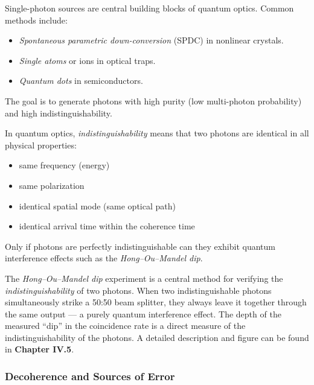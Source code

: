 Single-photon sources are central building blocks of quantum optics. Common methods include:
\begin{itemize}
	\item \emph{Spontaneous parametric down-conversion} (SPDC) in nonlinear crystals.
	\item \emph{Single atoms} or ions in optical traps.
	\item \emph{Quantum dots} in semiconductors.
\end{itemize}
The goal is to generate photons with high purity (low multi-photon probability) and high indistinguishability.
\newpage
\noindent
\vspace{1em}
\begin{tcolorbox}[hinweisbox, title=What Does “Indistinguishability” Mean? \label{box:indistinguishability}]
	\small
	In quantum optics, \emph{indistinguishability} means that two photons are identical in all physical properties:
	\begin{itemize}
		\item same frequency (energy)
		\item same polarization
		\item identical spatial mode (same optical path)
		\item identical arrival time within the coherence time
	\end{itemize}
	Only if photons are perfectly indistinguishable can they exhibit quantum interference effects such as the \emph{Hong–Ou–Mandel dip}.
\end{tcolorbox}
\vspace{1em}
\begin{tcolorbox}[physikbox, title=The Hong–Ou–Mandel Dip Phenomenon \label{box:hong_ou_mandel}]
	\small
	The \emph{Hong–Ou–Mandel dip} experiment is a central method for verifying the \emph{indistinguishability} of two photons. When two indistinguishable photons simultaneously strike a 50:50 beam splitter, they always leave it together through the same output — a purely quantum interference effect.  
	The depth of the measured “dip” in the coincidence rate is a direct measure of the indistinguishability of the photons.  
	A detailed description and figure can be found in \textbf{Chapter IV.5}.
\end{tcolorbox}

\subsubsection{Decoherence and Sources of Error}


